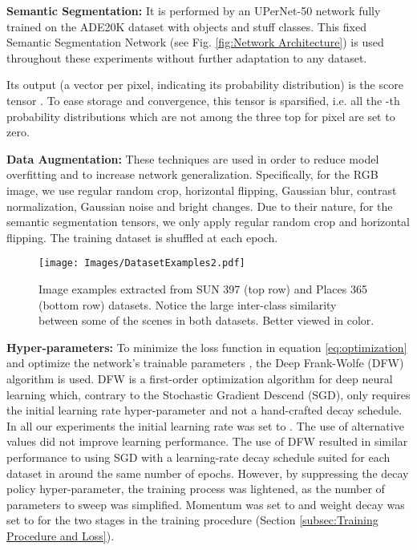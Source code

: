 \documentclass[review, 3p, sort&compress]{elsarticle}
\begin{document}
\textbf{Semantic Segmentation:} It is performed by an UPerNet-50 network \cite{xiao2018unified} fully trained on the ADE20K dataset with  objects and stuff classes. This fixed Semantic Segmentation Network (see Fig. \ref{fig:Network Architecture}) is used throughout these experiments without further adaptation to any dataset.

Its output (a  vector per pixel, indicating its probability distribution) is the score tensor . To ease storage and convergence, this tensor is sparsified, i.e. all the -th probability distributions which are not among the three top for pixel  are set to zero.

\textbf{Data Augmentation:} These techniques are used in order to reduce model overfitting and to increase network generalization. Specifically, for the RGB image, we use regular random crop, horizontal flipping, Gaussian blur, contrast normalization, Gaussian noise and bright changes. Due to their nature, for the semantic segmentation tensors, we only apply regular random crop and horizontal flipping. The training dataset is shuffled at each epoch.

\begin{figure*}[t!]
    \centering
    \texttt{[image: Images/DatasetExamples2.pdf]}
    \caption{Image examples extracted from SUN 397 \cite{xiao2010sun} (top row) and Places 365 \cite{zhou2018places} (bottom row) datasets. Notice the large inter-class similarity between some of the scenes in both datasets. Better viewed in color.}
    \label{fig:DatasetExamples2}
\end{figure*}

\textbf{Hyper-parameters:} To minimize the loss function in equation \ref{eq:optimization} and optimize the network's trainable parameters , the Deep Frank-Wolfe (DFW) \cite{berrada2018deep} algorithm is used. DFW is a first-order optimization algorithm for deep neural learning which, contrary to the Stochastic Gradient Descend (SGD), only requires the initial learning rate hyper-parameter and not a hand-crafted decay schedule. In all our experiments the initial learning rate was set to . The use of alternative values did not improve learning performance. The use of DFW resulted in similar performance to using SGD with a learning-rate decay schedule suited for each dataset in around the same number of epochs. However, by suppressing the decay policy hyper-parameter, the training process was lightened, as the number of parameters to sweep was simplified. Momentum was set to  and weight decay was set to  for the two stages in the training procedure (Section \ref{subsec:Training Procedure and Loss}).
\end{document}
